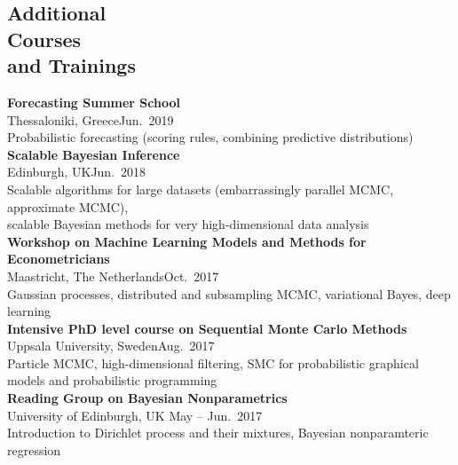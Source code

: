 \documentclass[margin,line]{resume}
\begin{document}
\begin{resume}
 


\section{\mysidestyle Additional\\ Courses \\and Trainings} 
	\textbf{Forecasting Summer School}\\
        Thessaloniki, Greece\hfill Jun.\ 2019\\
        Probabilistic forecasting (scoring rules, combining predictive distributions)\vspace{1.5mm} \\	
	\textbf{Scalable Bayesian Inference}\\
        Edinburgh, UK\hfill Jun.\ 2018\\
        Scalable algorithms for large datasets (embarrassingly parallel MCMC, approximate MCMC),\\ scalable Bayesian methods for very high-dimensional data analysis\vspace{1.5mm} \\	
	\textbf{Workshop on Machine Learning Models and Methods for Econometricians}\\
        Maastricht, The Netherlands\hfill Oct.\ 2017\\
        Gaussian processes, distributed and subsampling MCMC, variational Bayes,  deep learning\vspace{1.5mm} \\	
	\textbf{Intensive PhD level course on Sequential Monte Carlo Methods}\\
        Uppsala University, Sweden\hfill Aug.\ 2017\\
        Particle MCMC, high-dimensional filtering, SMC for probabilistic graphical models and probabilistic programming\vspace{1.5mm} \\        
	\textbf{Reading Group on Bayesian Nonparametrics}\\
        University of Edinburgh, UK \hfill May -- Jun.\ 2017\\
        Introduction to Dirichlet process and their mixtures, Bayesian nonparamteric regression\vspace{1.5mm} \\

\end{resume}
\end{document}
